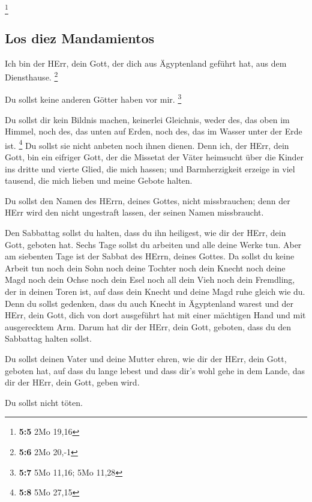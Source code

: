 \footnote{\textbf{5:5} 2Mo 19,16}

\hypertarget{los-diez-mandamientos}{%
\subsection{Los diez Mandamientos}\label{los-diez-mandamientos}}

 Ich bin der HErr, dein Gott, der dich aus Ägyptenland
geführt hat, aus dem Diensthause. \footnote{\textbf{5:6} 2Mo 20,-1}

 Du sollst keine anderen Götter haben vor mir. \footnote{\textbf{5:7}
  5Mo 11,16; 5Mo 11,28}

 Du sollst dir kein Bildnis machen, keinerlei Gleichnis,
weder des, das oben im Himmel, noch des, das unten auf Erden, noch des,
das im Wasser unter der Erde ist. \footnote{\textbf{5:8} 5Mo 27,15}
 Du sollst sie nicht anbeten noch ihnen dienen. Denn ich,
der HErr, dein Gott, bin ein eifriger Gott, der die Missetat der Väter
heimsucht über die Kinder ins dritte und vierte Glied, die mich hassen;
 und Barmherzigkeit erzeige in viel tausend, die mich
lieben und meine Gebote halten.

 Du sollst den Namen des HErrn, deines Gottes, nicht
missbrauchen; denn der HErr wird den nicht ungestraft lassen, der seinen
Namen missbraucht.

 Den Sabbattag sollst du halten, dass du ihn heiligest,
wie dir der HErr, dein Gott, geboten hat.  Sechs Tage
sollst du arbeiten und alle deine Werke tun.  Aber am
siebenten Tage ist der Sabbat des HErrn, deines Gottes. Da sollst du
keine Arbeit tun noch dein Sohn noch deine Tochter noch dein Knecht noch
deine Magd noch dein Ochse noch dein Esel noch all dein Vieh noch dein
Fremdling, der in deinen Toren ist, auf dass dein Knecht und deine Magd
ruhe gleich wie du.  Denn du sollst gedenken, dass du
auch Knecht in Ägyptenland warest und der HErr, dein Gott, dich von dort
ausgeführt hat mit einer mächtigen Hand und mit ausgerecktem Arm. Darum
hat dir der HErr, dein Gott, geboten, dass du den Sabbattag halten
sollst.

 Du sollst deinen Vater und deine Mutter ehren, wie dir
der HErr, dein Gott, geboten hat, auf dass du lange lebest und dass
dir's wohl gehe in dem Lande, das dir der HErr, dein Gott, geben wird.

 Du sollst nicht töten.


